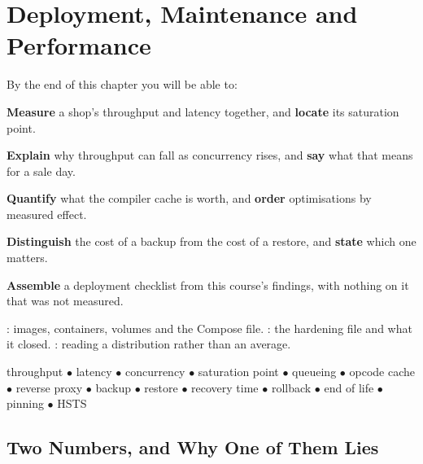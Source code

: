 \chapter{Deployment, Maintenance and Performance}\label{ch:deploy}

\begin{outcomes}
By the end of this chapter you will be able to:
\begin{tight}
  \item \textbf{Measure} a shop's throughput and latency together, and
        \textbf{locate} its saturation point.
  \item \textbf{Explain} why throughput can fall as concurrency rises, and
        \textbf{say} what that means for a sale day.
  \item \textbf{Quantify} what the compiler cache is worth, and
        \textbf{order} optimisations by measured effect.
  \item \textbf{Distinguish} the cost of a backup from the cost of a restore,
        and \textbf{state} which one matters.
  \item \textbf{Assemble} a deployment checklist from this course's findings,
        with nothing on it that was not measured.
\end{tight}
\end{outcomes}

\begin{prereq}
: images, containers, volumes and the Compose file.
: the hardening file and what it closed. :
reading a distribution rather than an average.
\end{prereq}

\begin{keyterms}
throughput $\bullet$ latency $\bullet$ concurrency $\bullet$ saturation point
$\bullet$ queueing $\bullet$ opcode cache $\bullet$ reverse proxy $\bullet$
backup $\bullet$ restore $\bullet$ recovery time $\bullet$ rollback $\bullet$
end of life $\bullet$ pinning $\bullet$ HSTS
\end{keyterms}

\section{Two Numbers, and Why One of Them Lies}

